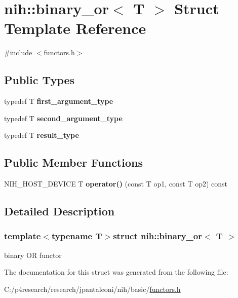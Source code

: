 \hypertarget{structnih_1_1binary__or}{
\section{nih\-:\-:binary\-\_\-or$<$ \-T $>$ \-Struct \-Template \-Reference}
\label{structnih_1_1binary__or}
}


{\ttfamily \#include $<$functors.\-h$>$}

\subsection*{\-Public \-Types}
\begin{DoxyCompactItemize}
\item 
\hypertarget{structnih_1_1binary__or_a2ad8e85de11ed333a0e4d4f5104e8096}{
typedef \-T {\bfseries first\-\_\-argument\-\_\-type}}
\label{structnih_1_1binary__or_a2ad8e85de11ed333a0e4d4f5104e8096}

\item 
\hypertarget{structnih_1_1binary__or_a4e58049960f38fa74a590f491a006125}{
typedef \-T {\bfseries second\-\_\-argument\-\_\-type}}
\label{structnih_1_1binary__or_a4e58049960f38fa74a590f491a006125}

\item 
\hypertarget{structnih_1_1binary__or_aac3c1a33d278c47774179ff49d1b9b5c}{
typedef \-T {\bfseries result\-\_\-type}}
\label{structnih_1_1binary__or_aac3c1a33d278c47774179ff49d1b9b5c}

\end{DoxyCompactItemize}
\subsection*{\-Public \-Member \-Functions}
\begin{DoxyCompactItemize}
\item 
\hypertarget{structnih_1_1binary__or_a6ee8dab1c1cbb72fe0f02304093017c0}{
\-N\-I\-H\-\_\-\-H\-O\-S\-T\-\_\-\-D\-E\-V\-I\-C\-E \-T {\bfseries operator()} (const \-T op1, const \-T op2) const }
\label{structnih_1_1binary__or_a6ee8dab1c1cbb72fe0f02304093017c0}

\end{DoxyCompactItemize}


\subsection{\-Detailed \-Description}
\subsubsection*{template$<$typename T$>$struct nih\-::binary\-\_\-or$<$ T $>$}

binary \-O\-R functor 

\-The documentation for this struct was generated from the following file\-:\begin{DoxyCompactItemize}
\item 
\-C\-:/p4research/research/jpantaleoni/nih/basic/\hyperlink{functors_8h}{functors.\-h}\end{DoxyCompactItemize}
